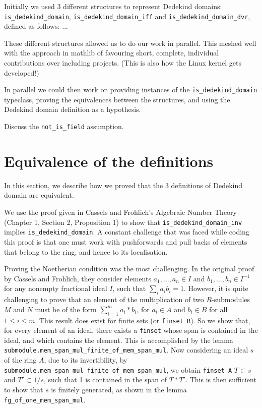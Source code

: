 \documentclass{lipics-v2021}
\newcommand{\lean}[1]{\texttt{#1}\xspace} %
\begin{document}
Initially we used 3 different structures to represent Dedekind domains: \lean{is\_dedekind\_domain}, \lean{is\_dedekind\_domain\_iff} and \lean{is\_dedekind\_domain\_dvr}, defined as follows:
...

These different structures allowed us to do our work in parallel. This meshed well with the approach in mathlib of favouring short, complete, individual contributions over including projects. (This is also how the Linux kernel gets developed!)

In parallel we could then work on providing instances of the \lean{is\_dedekind\_domain} typeclass, proving the equivalences between the structures, and using the Dedekind domain definition as a hypothesis.

Discuss the \lean{not\_is\_field} assumption.

\section{Equivalence of the definitions}

In this section, we describe how we proved that the 3 definitions of Dedekind domain are equivalent.

We use the proof given in Cassels and Frohlich's Algebraic Number Theory (Chapter 1, Section 2, Proposition 1) to show that \lean{is\_dedekind\_domain\_inv} implies \lean{is\_dedekind\_domain}. A constant challenge that was faced while coding this proof is that one must work with pushforwards and pull backs of elements that belong to the ring, and hence to its localisation. 

Proving the Noetherian condition was the most challenging. In the original proof by Cassels and Frohlich, they consider elements $a_1, \dots, a_n \in I$ and $b_1, \dots, b_n \in I^{-1}$ for any nonempty fractional ideal $I$, such that $ \sum_i a_i b_i = 1 $. However, it is quite challenging to prove that an element of the multiplication of two $R$-submodules $M$ and $N$ must be of the form $\sum_{i = 1}^m a_i*b_i$, for $a_i \in A$ and $b_i \in B$ for all $1 \leq i \leq m$. This result does exist for finite sets (or \lean{finset R}). So we show that, for every element of an ideal, there exists a \lean{finset} whose span is contained in the ideal, and which contains the element. This is accomplished by the lemma \lean{submodule.mem\_span\_mul\_finite\_of\_mem\_span\_mul}. Now considering an ideal $s$ of the ring $A$, due to its invertibility, by \lean{submodule.mem\_span\_mul\_finite\_of\_mem\_span\_mul}, we obtain \lean{finset A} $T \subset s$ and $T' \subset 1/s$, such that 1 is contained in the span of $T*T'$. This is then sufficient to show that $s$ is finitely generated, as shown in the lemma \lean{fg_of_one_mem_span_mul}.
\end{document}
